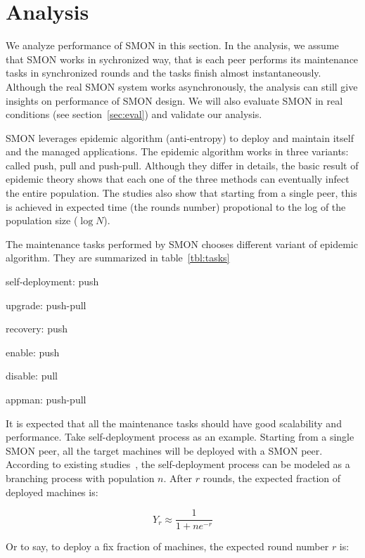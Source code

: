 \section{Analysis}
\label{sec:analysis}

We analyze performance of SMON in this section. In the analysis,
we assume that SMON works in sychronized way, that is each peer
performs its maintenance tasks in synchronized rounds and the
tasks finish almost instantaneously. Although the real SMON
system works asynchronously, the analysis can still give
insights on performance of SMON design. We will also evaluate
SMON in real conditions (see section~\ref{sec:eval}) and
validate our analysis.


SMON leverages epidemic algorithm (anti-entropy) to deploy
and maintain itself and the managed applications. The
epidemic algorithm works in three variants: called push,
pull and push-pull. Although they differ in details, the
basic result of epidemic theory shows that each one of the
three methods can eventually infect the entire population.
The studies also show that starting from a single peer, this
is achieved in expected time (the rounds number) propotional
to the log of the population size ($\log N$).

The maintenance tasks performed by SMON chooses
different variant of epidemic algorithm. They are summarized
in table~\ref{tbl:tasks}

self-deployment: push

upgrade: push-pull

recovery: push

enable: push

disable: pull

appman: push-pull

It is expected that all the maintenance tasks should have
good scalability and performance. Take self-deployment
process as an example. Starting from a single SMON peer, all
the target machines will be deployed with a SMON peer.
According to existing studies~\cite{Eugster2004}, the
self-deployment process can be modeled as a branching
process with population $n$. After $r$ rounds, the expected
fraction of deployed machines is:

\begin{equation*}
Y_r \approx \frac{1}{1+ne^{-r}} 
\end{equation*}

Or to say, to deploy a fix fraction of machines, the
expected round number $r$ is:

